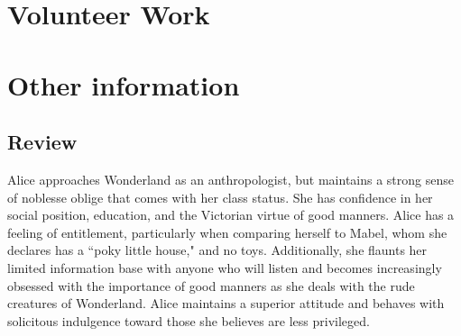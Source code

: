 \documentclass[a4paper]{twentysecondcv} %
\begin{document}

\section{Volunteer Work}

\begin{twentyshort} %

\end{twentyshort}

\section{Other information}

\subsection{Review}

Alice approaches Wonderland as an anthropologist, but maintains a strong sense of noblesse oblige that comes with her class status. She has confidence in her social position, education, and the Victorian virtue of good manners. Alice has a feeling of entitlement, particularly when comparing herself to Mabel, whom she declares has a ``poky little house," and no toys. Additionally, she flaunts her limited information base with anyone who will listen and becomes increasingly obsessed with the importance of good manners as she deals with the rude creatures of Wonderland. Alice maintains a superior attitude and behaves with solicitous indulgence toward those she believes are less privileged.

\end{document}
